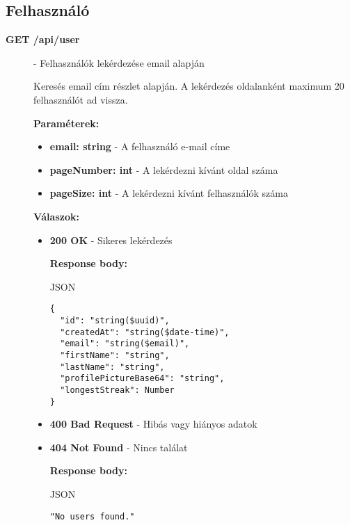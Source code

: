 \documentclass[12pt]{report}
\begin{document}
\subsection{Felhasználó}
\begin{description}
  \item[\textbf{GET /api/user}] - Felhasználók lekérdezése email alapján
  
    \vspace{0.5cm}
    Keresés email cím részlet alapján. A lekérdezés oldalanként maximum 20 felhasználót ad vissza.

    \vspace{0.5cm}
    \textbf{Paraméterek:}
    \begin{itemize}
      \item \textbf{email: string} - A felhasználó e-mail címe
      \item \textbf{pageNumber: int} - A lekérdezni kívánt oldal száma
      \item \textbf{pageSize: int} - A lekérdezni kívánt felhasználók száma
    \end{itemize}

    \vspace{0.5cm}
    \textbf{Válaszok:}
    \begin{itemize}
      \item \textbf{200 OK} - Sikeres lekérdezés

        \textbf{Response body:}
        \begin{codeblock}{JSON}
          \begin{verbatim}
{
  "id": "string($uuid)",
  "createdAt": "string($date-time)",
  "email": "string($email)",
  "firstName": "string",
  "lastName": "string",
  "profilePictureBase64": "string",
  "longestStreak": Number
}
          \end{verbatim}
        \end{codeblock}

      \item \textbf{400 Bad Request} - Hibás vagy hiányos adatok
      \item \textbf{404 Not Found} - Nincs találat

      \textbf{Response body:}
      \begin{codeblock}{JSON}
        \begin{verbatim}
"No users found."
        \end{verbatim}
      \end{codeblock}
    \end{itemize}


\end{description}
\end{document}
